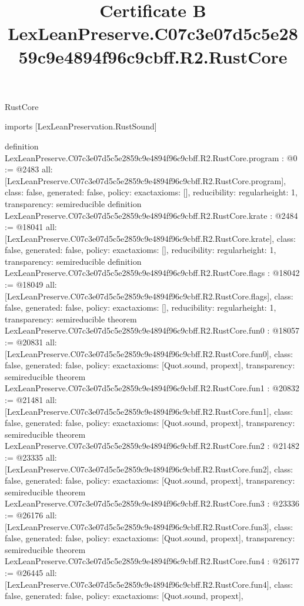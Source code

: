 \begin{lexlean}{RustCore}
\title{Certificate B LexLeanPreserve.C07c3e07d5c5e2859c9e4894f96c9cbff.R2.RustCore}
\begin{coremodule}
imports [LexLeanPreservation.RustSound]

definition LexLeanPreserve.C07c3e07d5c5e2859c9e4894f96c9cbff.R2.RustCore.program : @0 := @2483 {
  all: [LexLeanPreserve.C07c3e07d5c5e2859c9e4894f96c9cbff.R2.RustCore.program],
  class: false,
  generated: false,
  policy: exact{axioms: []},
  reducibility: regular{height: 1},
  transparency: semireducible
}
definition LexLeanPreserve.C07c3e07d5c5e2859c9e4894f96c9cbff.R2.RustCore.krate : @2484 := @18041 {
  all: [LexLeanPreserve.C07c3e07d5c5e2859c9e4894f96c9cbff.R2.RustCore.krate],
  class: false,
  generated: false,
  policy: exact{axioms: []},
  reducibility: regular{height: 1},
  transparency: semireducible
}
definition LexLeanPreserve.C07c3e07d5c5e2859c9e4894f96c9cbff.R2.RustCore.flags : @18042 := @18049 {
  all: [LexLeanPreserve.C07c3e07d5c5e2859c9e4894f96c9cbff.R2.RustCore.flags],
  class: false,
  generated: false,
  policy: exact{axioms: []},
  reducibility: regular{height: 1},
  transparency: semireducible
}
theorem LexLeanPreserve.C07c3e07d5c5e2859c9e4894f96c9cbff.R2.RustCore.fun0 : @18057 := @20831 {
  all: [LexLeanPreserve.C07c3e07d5c5e2859c9e4894f96c9cbff.R2.RustCore.fun0],
  class: false,
  generated: false,
  policy: exact{axioms: [Quot.sound, propext]},
  transparency: semireducible
}
theorem LexLeanPreserve.C07c3e07d5c5e2859c9e4894f96c9cbff.R2.RustCore.fun1 : @20832 := @21481 {
  all: [LexLeanPreserve.C07c3e07d5c5e2859c9e4894f96c9cbff.R2.RustCore.fun1],
  class: false,
  generated: false,
  policy: exact{axioms: [Quot.sound, propext]},
  transparency: semireducible
}
theorem LexLeanPreserve.C07c3e07d5c5e2859c9e4894f96c9cbff.R2.RustCore.fun2 : @21482 := @23335 {
  all: [LexLeanPreserve.C07c3e07d5c5e2859c9e4894f96c9cbff.R2.RustCore.fun2],
  class: false,
  generated: false,
  policy: exact{axioms: [Quot.sound, propext]},
  transparency: semireducible
}
theorem LexLeanPreserve.C07c3e07d5c5e2859c9e4894f96c9cbff.R2.RustCore.fun3 : @23336 := @26176 {
  all: [LexLeanPreserve.C07c3e07d5c5e2859c9e4894f96c9cbff.R2.RustCore.fun3],
  class: false,
  generated: false,
  policy: exact{axioms: [Quot.sound, propext]},
  transparency: semireducible
}
theorem LexLeanPreserve.C07c3e07d5c5e2859c9e4894f96c9cbff.R2.RustCore.fun4 : @26177 := @26445 {
  all: [LexLeanPreserve.C07c3e07d5c5e2859c9e4894f96c9cbff.R2.RustCore.fun4],
  class: false,
  generated: false,
  policy: exact{axioms: [Quot.sound, propext]},
}
\end{coremodule}
\end{lexlean}
